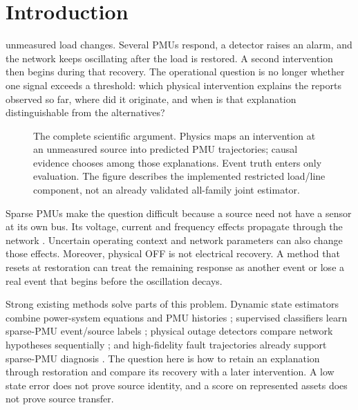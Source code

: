 \section{Introduction}
\label{sec:introduction}

 unmeasured load changes. Several PMUs respond, a detector raises an alarm, and the network keeps oscillating after the load is restored. A second intervention then begins during that recovery. The operational question is no longer whether one signal exceeds a threshold: which physical intervention explains the reports observed so far, where did it originate, and when is that explanation distinguishable from the alternatives?

\begin{figure}[t]\centering
\resizebox{\textwidth}{!}{}
\caption{The complete scientific argument. Physics maps an intervention at an unmeasured source into predicted PMU trajectories; causal evidence chooses among those explanations. Event truth enters only evaluation. The figure describes the implemented restricted load/line component, not an already validated all-family joint estimator.}
\label{fig:joint-architecture}\end{figure}

Sparse PMUs make the question difficult because a source need not have a sensor at its own bus. Its voltage, current and frequency effects propagate through the network \cite{phadke2008synchronized,zhao2019dse}. Uncertain operating context and network parameters can also change those effects. Moreover, physical OFF is not electrical recovery. A method that resets at restoration can treat the remaining response as another event or lose a real event that begins before the oscillation decays.

Strong existing methods solve parts of this problem. Dynamic state estimators combine power-system equations and PMU histories \cite{katanic2024recursive}; supervised classifiers learn sparse-PMU event/source labels \cite{pandey2020realtime,yildiz2024few}; physical outage detectors compare network hypotheses sequentially \cite{chen2016quickest,rovatsos2017outage}; and high-fidelity fault trajectories already support sparse-PMU diagnosis \cite{warner2023highfidelity}. The question here is how to retain an explanation through restoration and compare its recovery with a later intervention. A low state error does not prove source identity, and a score on represented assets does not prove source transfer.

